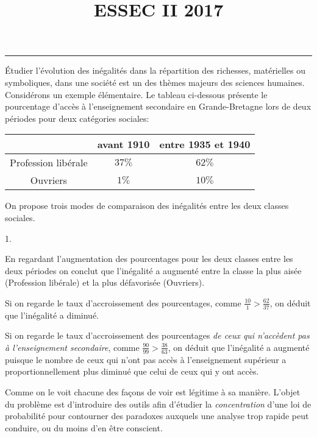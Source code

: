 \documentclass[11pt]{article}%
\title{\bf \vspace{-1.6cm} ESSEC II 2017} %
\author{} %
\date{} %
\begin{document}
\maketitle %
\vspace{-1.2cm}\hrule %
\thispagestyle{fancy}

\vspace*{.4cm}


\noindent
Étudier l'évolution des inégalités dans la répartition des richesses, 
matérielles ou symboliques, dans une société est un des thèmes majeurs 
des sciences humaines. Considérons un exemple élémentaire. Le tableau 
ci-dessous présente le pourcentage d'accès à l'enseignement secondaire 
en Grande-Bretagne lors de deux périodes pour deux catégories sociales: 
\\
\begin{center} 
 \begin{tabular}{c|c|c|} 
  & avant 1910 & entre 1935 et 1940\\ \hline
  Profession libérale & $37\%$ & $62\%$ \\ \hline
  Ouvriers & $1\%$ & $10\%$ \\ \hline
 \end{tabular}
\end{center}
On propose trois modes de comparaison des inégalités entre les deux 
classes sociales.
\begin{noliste}{1.}
 \item En regardant l'augmentation des pourcentages pour les deux 
 classes entre les deux périodes on conclut que l'inégalité a augmenté 
 entre la classe la plus aisée (Profession libérale) et la plus 
 défavorisée (Ouvriers). 
 
 \item Si on regarde le taux d'accroissement des pourcentages, comme 
 $\frac{10}{1} > \frac{62}{37}$, on déduit que l'inégalité a diminué.
 
 \item Si on regarde le taux d'accroissement des pourcentages \emph{de 
 ceux qui n'accèdent pas à l'enseignement secondaire}, comme 
 $\frac{90}{99} > \frac{38}{63}$, on déduit que l'inégalité a 
 augmenté puisque le nombre de ceux qui n'ont pas accès à 
 l'enseignement supérieur a proportionnellement plus diminué que celui 
 de ceux qui y ont accès.
\end{noliste}
Comme on le voit chacune des façons de voir est légitime à sa manière. 
L'objet du problème est d'introduire des outils afin d'étudier la 
\emph{concentration} d'une loi de probabilité pour contourner des 
paradoxes auxquels une analyse trop rapide peut conduire, ou du moins 
d'en être conscient.
\end{document}
